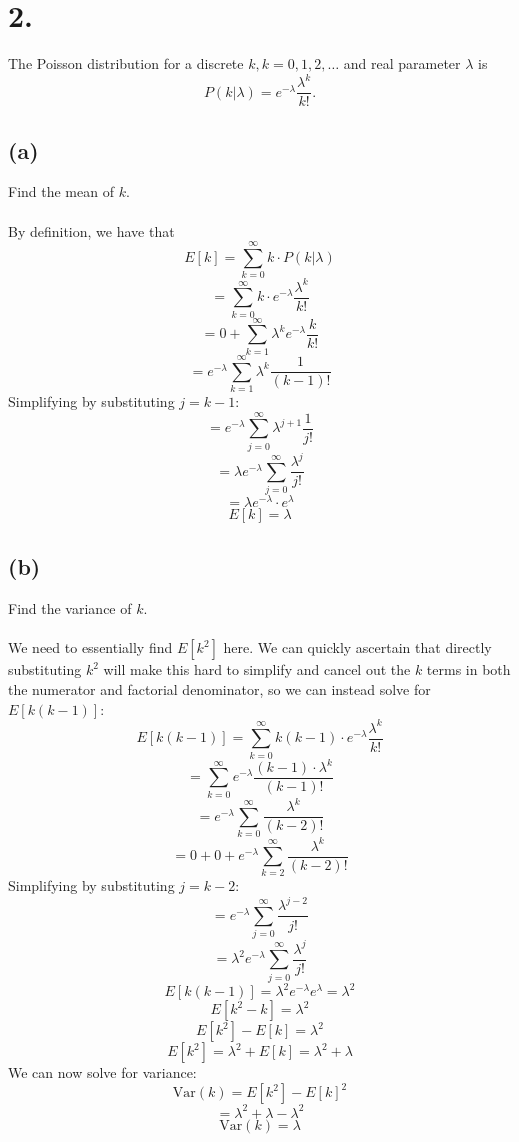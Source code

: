 \documentclass{article}
\begin{document}
{\Large 

\section*{2.}
The Poisson distribution for a discrete \(k, k = 0, 1, 2, \dots\) and real parameter \(\lambda\) is 
\[
  P(k | \lambda) = e^{-\lambda} \frac{\lambda^k}{k!}.
\]

\subsection*{(a)} 
Find the mean of \(k\). \\ \\
By definition, we have that 
\[
  E[k] = \sum_{k=0}^{\infty} k \cdot P(k | \lambda) 
\]
\[
  = \sum_{k=0}^{\infty} k \cdot e^{-\lambda} \frac{\lambda^k}{k!}
\]
\[
  = 0 + \sum_{k=1}^{\infty} \lambda^k e^{-\lambda} \frac{k}{k!}
\]
\[
  = e^{-\lambda} \sum_{k=1}^{\infty} \lambda^k \frac{1}{(k-1)!}
\]
Simplifying by substituting \(j = k-1\):
\[
  = e^{-\lambda} \sum_{j=0}^{\infty} \lambda^{j + 1} \frac{1}{j!}
\]
\[
  = \lambda e^{-\lambda} \sum_{j=0}^{\infty} \frac{\lambda^{j}}{j!}
\]
\[
  = \lambda e^{-\lambda} \cdot e^{\lambda}
\]
\[
  \boxed{E[k] = \lambda }
\]

\subsection*{(b)}
Find the variance of \(k\). \\ \\
We need to essentially find \(E[k^2]\) here. We can quickly ascertain that directly substituting \(k^2\) will make this hard to simplify and cancel out the \(k\) terms in both the numerator and factorial denominator, so we can instead solve for \(E[k(k-1)]\):
\[
  E[k(k-1)] = \sum_{k=0}^{\infty} k(k-1) \cdot e^{-\lambda} \frac{\lambda^k}{k!}
\]
\[
  = \sum_{k=0}^{\infty} e^{-\lambda} \frac{(k-1) \cdot \lambda^k}{(k-1)!}
\]
\[
  = e^{-\lambda} \sum_{k=0}^{\infty} \frac{\lambda^k}{(k-2)!}
\]
\[
  = 0 + 0 + e^{-\lambda} \sum_{k=2}^{\infty} \frac{\lambda^k}{(k-2)!}
\]
Simplifying by substituting \(j = k - 2\):
\[
  = e^{-\lambda} \sum_{j=0}^{\infty} \frac{\lambda^{j-2}}{j!}
\]
\[
  = \lambda^2 e^{-\lambda} \sum_{j=0}^{\infty} \frac{\lambda^{j}}{j!}
\]
\[
  E[k(k-1)] = \lambda^2 e^{-\lambda} e^{\lambda} = \lambda^2
\]
\[
  E[k^2 - k] = \lambda^2 
\]
\[
  E[k^2] - E[k] = \lambda^2
\]
\[
  E[k^2] = \lambda^2 + E[k] = \lambda^2 + \lambda
\]
We can now solve for variance:
\[
  \text{Var}(k) = E[k^2] - E[k]^2
\]
\[
  = \lambda^2 + \lambda - \lambda^2
\]
\[
  \boxed{\text{Var}(k) = \lambda}
\]


}
\end{document}
